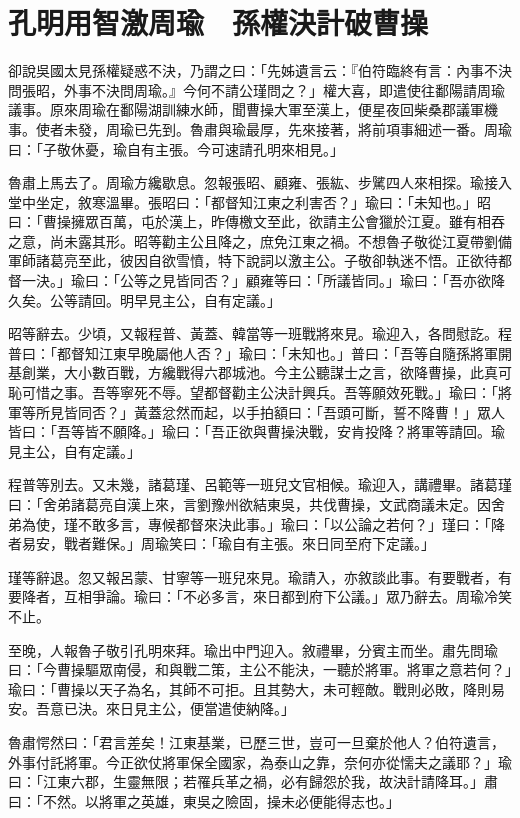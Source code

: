 
\chapter{孔明用智激周瑜　孫權決計破曹操}

卻說吳國太見孫權疑惑不決，乃謂之曰：「先姊遺言云：『伯符臨終有言：內事不決問張昭，外事不決問周瑜。』今何不請公瑾問之？」權大喜，即遣使往鄱陽請周瑜議事。原來周瑜在鄱陽湖訓練水師，聞曹操大軍至漢上，便星夜回柴桑郡議軍機事。使者未發，周瑜已先到。魯肅與瑜最厚，先來接著，將前項事細述一番。周瑜曰：「子敬休憂，瑜自有主張。今可速請孔明來相見。」

魯肅上馬去了。周瑜方纔歇息。忽報張昭、顧雍、張紘、步騭四人來相探。瑜接入堂中坐定，敘寒溫畢。張昭曰：「都督知江東之利害否？」瑜曰：「未知也。」昭曰：「曹操擁眾百萬，屯於漢上，昨傳檄文至此，欲請主公會獵於江夏。雖有相吞之意，尚未露其形。昭等勸主公且降之，庶免江東之禍。不想魯子敬從江夏帶劉備軍師諸葛亮至此，彼因自欲雪憤，特下說詞以激主公。子敬卻執迷不悟。正欲待都督一決。」瑜曰：「公等之見皆同否？」顧雍等曰：「所議皆同。」瑜曰：「吾亦欲降久矣。公等請回。明早見主公，自有定議。」

昭等辭去。少頃，又報程普、黃蓋、韓當等一班戰將來見。瑜迎入，各問慰訖。程普曰：「都督知江東早晚屬他人否？」瑜曰：「未知也。」普曰：「吾等自隨孫將軍開基創業，大小數百戰，方纔戰得六郡城池。今主公聽謀士之言，欲降曹操，此真可恥可惜之事。吾等寧死不辱。望都督勸主公決計興兵。吾等願效死戰。」瑜曰：「將軍等所見皆同否？」黃蓋忿然而起，以手拍額曰：「吾頭可斷，誓不降曹！」眾人皆曰：「吾等皆不願降。」瑜曰：「吾正欲與曹操決戰，安肯投降？將軍等請回。瑜見主公，自有定議。」

程普等別去。又未幾，諸葛瑾、呂範等一班兒文官相候。瑜迎入，講禮畢。諸葛瑾曰：「舍弟諸葛亮自漢上來，言劉豫州欲結東吳，共伐曹操，文武商議未定。因舍弟為使，瑾不敢多言，專候都督來決此事。」瑜曰：「以公論之若何？」瑾曰：「降者易安，戰者難保。」周瑜笑曰：「瑜自有主張。來日同至府下定議。」

瑾等辭退。忽又報呂蒙、甘寧等一班兒來見。瑜請入，亦敘談此事。有要戰者，有要降者，互相爭論。瑜曰：「不必多言，來日都到府下公議。」眾乃辭去。周瑜冷笑不止。

至晚，人報魯子敬引孔明來拜。瑜出中門迎入。敘禮畢，分賓主而坐。肅先問瑜曰：「今曹操驅眾南侵，和與戰二策，主公不能決，一聽於將軍。將軍之意若何？」瑜曰：「曹操以天子為名，其師不可拒。且其勢大，未可輕敵。戰則必敗，降則易安。吾意已決。來日見主公，便當遣使納降。」

魯肅愕然曰：「君言差矣！江東基業，已歷三世，豈可一旦棄於他人？伯符遺言，外事付託將軍。今正欲仗將軍保全國家，為泰山之靠，奈何亦從懦夫之議耶？」瑜曰：「江東六郡，生靈無限；若罹兵革之禍，必有歸怨於我，故決計請降耳。」肅曰：「不然。以將軍之英雄，東吳之險固，操未必便能得志也。」

